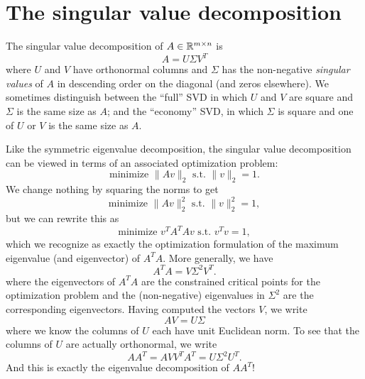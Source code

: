 \documentclass[12pt, leqno]{article} %
\begin{document}
\section{The singular value decomposition}

The singular value decomposition of $A \in \mathbb{R}^{m \times n}$ is
\[
  A = U \Sigma V^T
\]
where $U$ and $V$ have orthonormal columns and $\Sigma$ has the
non-negative {\em singular values} of $A$ in descending order on the
diagonal (and zeros elsewhere).  We sometimes distinguish between the
``full'' SVD in which $U$ and $V$ are square and $\Sigma$ is the same
size as $A$; and the ``economy'' SVD, in which $\Sigma$ is square and
one of $U$ or $V$ is the same size as $A$.

Like the symmetric eigenvalue decomposition, the singular value
decomposition can be viewed in terms of an associated optimization
problem:
\[
  \mbox{minimize } \|Av\|_2 \mbox{~s.t.~} \|v\|_2 = 1.
\]
We change nothing by squaring the norms to get
\[
  \mbox{minimize } \|Av\|_2^2 \mbox{~s.t.~} \|v\|_2^2 = 1,
\]
but we can rewrite this as
\[
  \mbox{minimize } v^T A^T A v \mbox{~s.t.~} v^T v = 1,
\]
which we recognize as exactly the optimization formulation of the
maximum eigenvalue (and eigenvector) of $A^T A$.  More generally,
we have
\[
  A^T A = V \Sigma^2 V^T.
\]
where the eigenvectors of $A^T A$ are the constrained critical points
for the optimization problem and the (non-negative) eigenvalues in
$\Sigma^2$ are the corresponding eigenvectors.  Having computed the
vectors $V$, we write
\[
  A V = U \Sigma
\]
where we know the columns of $U$ each have unit Euclidean norm.  To
see that the columns of $U$ are actually orthonormal, we write
\[
  AA^T = AV V^T A^T = U \Sigma^2 U^T.
\]
And this is exactly the eigenvalue decomposition of $AA^T$!
\end{document}

